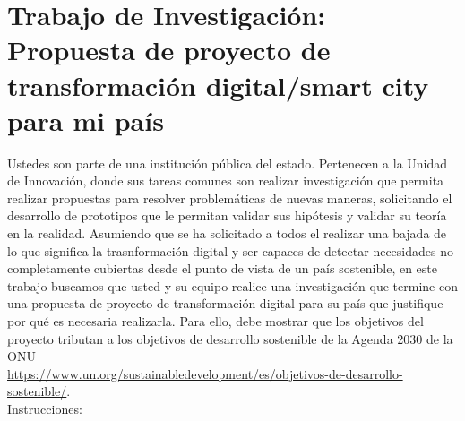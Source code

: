 \section{Trabajo de Investigación: Propuesta de proyecto de transformación digital/smart city para mi país}
Ustedes son parte de una institución pública del estado. Pertenecen a la Unidad de Innovación, donde sus tareas comunes son realizar investigación que permita realizar propuestas para resolver problemáticas de nuevas maneras, solicitando el desarrollo de prototipos que le permitan validar sus hipótesis y validar su teoría en la realidad. Asumiendo que se ha solicitado a todos el realizar una bajada de lo que significa la trasnformación digital y ser capaces de detectar necesidades no completamente cubiertas desde el punto de vista de un país sostenible, en este trabajo buscamos que usted y su equipo realice una investigación que termine con una propuesta de proyecto de transformación digital para su país que justifique por qué es necesaria realizarla. Para ello, debe mostrar que los objetivos del proyecto tributan a los objetivos  de desarrollo sostenible de la Agenda 2030 de la ONU \\ \url{https://www.un.org/sustainabledevelopment/es/objetivos-de-desarrollo-sostenible/}.  \\
Instrucciones:
